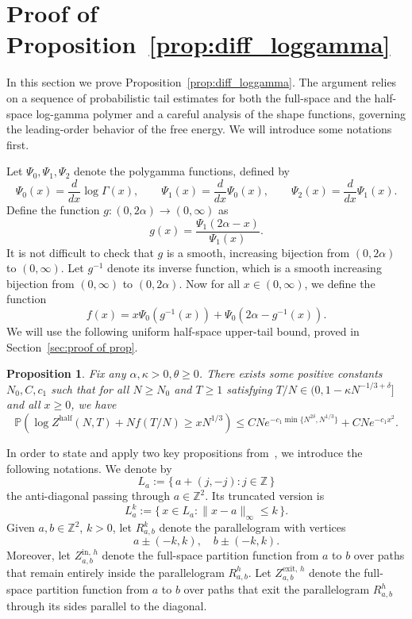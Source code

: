 \documentclass[11pt]{article}
\newtheorem{proposition}[theorem]{Proposition}
\theoremstyle{definition}
\newcommand{\Z}{\mathbb{Z}}
\newcommand{\Prob}{\mathbb{P}}
\begin{document}
\section{Proof of Proposition~\ref{prop:diff_loggamma}}
In this section we prove Proposition~\ref{prop:diff_loggamma}.
The argument relies on a sequence of probabilistic tail estimates for both the full-space and the half-space log-gamma polymer and a careful analysis of the shape functions, governing the leading-order behavior of the free energy. We will introduce some notations first.

Let $\Psi_0,\Psi_1,\Psi_2$ denote the polygamma functions, defined by
\[
\Psi_0(x) = \frac{d}{dx}\log \Gamma(x), \qquad
\Psi_1(x) = \frac{d}{dx}\Psi_0(x), \qquad
\Psi_2(x) = \frac{d}{dx}\Psi_1(x).
\]
Define the function $g: (0,2\alpha) \rightarrow (0,\infty)$ as
\[
g(x) = \frac{\Psi_1(2\alpha - x)}{\Psi_1(x)}.
\]
It is not difficult to check that $g$ is a smooth, increasing bijection from $(0,2\alpha)$ to $(0, \infty)$. Let $g^{-1}$ denote its inverse function, which is a smooth increasing bijection from $(0, \infty)$ to $(0,2\alpha)$. Now for all $x \in (0, \infty)$, we define the function
\[
f(x) = x\Psi_0(g^{-1}(x)) + \Psi_0(2\alpha - g^{-1}(x)).
\]
We will use the following uniform half-space upper-tail bound, proved in
Section~\ref{sec:proof of prop}.
\begin{proposition}\label{prop:uniform_upper_tail}
    Fix any $\alpha,\kappa>0, \theta \geq 0$. There exists some positive constants $N_0, C, c_1$ such that for all $N \geq N_0$ and $T \geq 1$ satisfying $T/N \in (0, 1-\kappa N^{-1/3+\delta}]$ and all $x \geq 0$, we have
    \begin{equation}
        \Prob\left(\log Z^{\mathrm{half}}(N,T) + Nf\left(T/N\right) \geq xN^{1/3}\right) \leq CNe^{-c_1 \min \{N^{2\delta}, N^{1/3}\}} + CNe^{-c_1x^2}.
    \end{equation}  
\end{proposition}

In order to state and apply two key propositions from~\cite{basu2024temporal},
we introduce the following notations. We denote by
\[
L_a := \{\, a+(j,-j) : j\in\mathbb Z \,\}
\]
the anti-diagonal passing through $a \in \Z^2$.  Its truncated version is
\[
L_a^{k} := \{\, x\in L_a : \|x-a\|_\infty \le k \,\}.
\]
Given $a,b\in\mathbb Z^2$, $k >0$, let $R_{a,b}^{k}$ denote the 
parallelogram with vertices 
\[
a \pm (-k,k), \quad b \pm (-k,k).
\]
Moreover, let $Z^{\mathrm{in},\,h}_{a,b}$ denote the full-space partition function from $a$ to $b$ over paths that remain entirely inside the parallelogram $R^h_{a,b}$. Let $Z^{\mathrm{exit},\,h}_{a,b}$ denote the full-space partition function from $a$ to $b$ over paths that exit the parallelogram $R^h_{a,b}$ through its sides parallel to the diagonal. 
\end{document}
